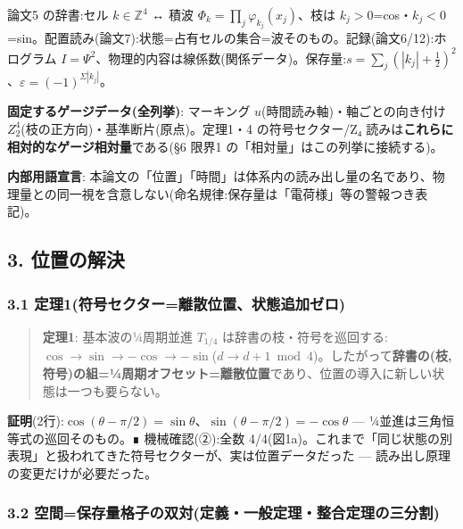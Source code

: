 \documentclass[
]{ltjsarticle}
\begin{document}
論文5 の辞書:セル \(k\in\mathbb{Z}^4\) ↔ 積波
\(\Phi_k=\prod_j\varphi_{k_j}(x_j)\)、枝は
\(k_j>0\)=cos・\(k_j<0\)=sin。配置読み(論文7):状態=占有セルの集合=波そのもの。記録(論文6/12):ホログラム
\(I=\Psi^2\)、物理的内容は線係数(関係データ)。保存量:\(s=\sum_j(|k_j|+\tfrac12)^2\)、\(\varepsilon=(-1)^{\Sigma|k_j|}\)。

\textbf{固定するゲージデータ(全列挙)}: マーキング
\(u\)(時間読み軸)・軸ごとの向き付け
\(Z_2^{4}\)(枝の正方向)・基準断片(原点)。定理1・4 の符号セクター/Z₄
読みは\textbf{これらに相対的なゲージ相対量}である(§6 限界1
の「相対量」はこの列挙に接続する)。

\textbf{内部用語宣言}:
本論文の「位置」「時間」は体系内の読み出し量の名であり、物理量との同一視を含意しない(命名規律:保存量は「電荷様」等の警報つき表記)。

\subsection{3. 位置の解決}\label{ux4f4dux7f6eux306eux89e3ux6c7a}

\subsubsection{3.1
定理1(符号セクター=離散位置、状態追加ゼロ)}\label{ux5b9aux74061ux7b26ux53f7ux30bbux30afux30bfux30fcux96e2ux6563ux4f4dux7f6eux72b6ux614bux8ffdux52a0ux30bcux30ed}

\begin{quote}
\textbf{定理1}: 基本波の¼周期並進 \(T_{1/4}\)
は辞書の枝・符号を巡回する:\(\cos\to\sin\to-\cos\to-\sin\)(\(d\to d+1\bmod 4\))。したがって\textbf{辞書の(枝,
符号)の組=¼周期オフセット=離散位置}であり、位置の導入に新しい状態は一つも要らない。
\end{quote}

\textbf{証明}(2行):\(\cos(\theta-\pi/2)=\sin\theta\)、\(\sin(\theta-\pi/2)=-\cos\theta\)
--- ¼並進は三角恒等式の巡回そのもの。∎ 機械確認(②):全数
4/4(図1a)。これまで「同じ状態の別表現」と扱われてきた符号セクターが、実は位置データだった
--- 読み出し原理の変更だけが必要だった。

\subsubsection{3.2
空間=保存量格子の双対(定義・一般定理・整合定理の三分割)}\label{ux7a7aux9593ux4fddux5b58ux91cfux683cux5b50ux306eux53ccux5bfeux5b9aux7fa9ux4e00ux822cux5b9aux7406ux6574ux5408ux5b9aux7406ux306eux4e09ux5206ux5272}
\end{document}
